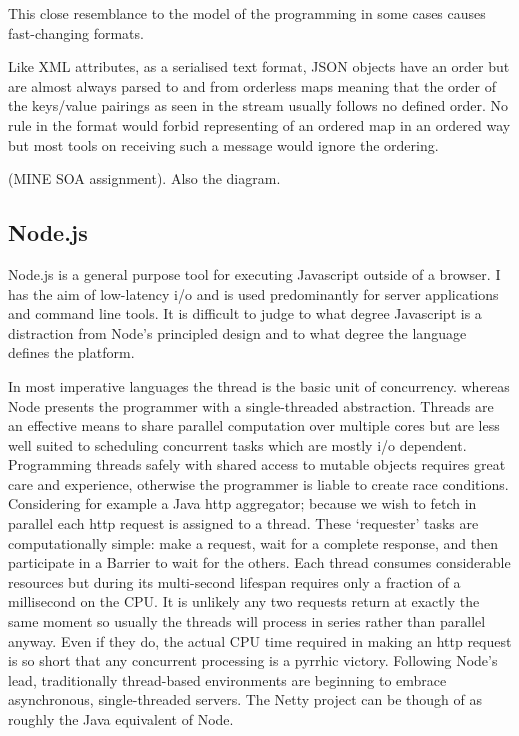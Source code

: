 \documentclass[]{article}
\begin{document}
This close resemblance to the model of the programming in some cases
causes fast-changing formats.

Like XML attributes, as a serialised text format, JSON objects have an
order but are almost always parsed to and from orderless maps meaning
that the order of the keys/value pairings as seen in the stream usually
follows no defined order. No rule in the format would forbid
representing of an ordered map in an ordered way but most tools on
receiving such a message would ignore the ordering.

(MINE SOA assignment). Also the diagram.

\subsection{Node.js}

Node.js is a general purpose tool for executing Javascript outside of a
browser. I has the aim of low-latency i/o and is used predominantly for
server applications and command line tools. It is difficult to judge to
what degree Javascript is a distraction from Node's principled design
and to what degree the language defines the platform.

In most imperative languages the thread is the basic unit of
concurrency. whereas Node presents the programmer with a single-threaded
abstraction. Threads are an effective means to share parallel
computation over multiple cores but are less well suited to scheduling
concurrent tasks which are mostly i/o dependent. Programming threads
safely with shared access to mutable objects requires great care and
experience, otherwise the programmer is liable to create race
conditions. Considering for example a Java http aggregator; because we
wish to fetch in parallel each http request is assigned to a thread.
These `requester' tasks are computationally simple: make a request, wait
for a complete response, and then participate in a Barrier to wait for
the others. Each thread consumes considerable resources but during its
multi-second lifespan requires only a fraction of a millisecond on the
CPU. It is unlikely any two requests return at exactly the same moment
so usually the threads will process in series rather than parallel
anyway. Even if they do, the actual CPU time required in making an http
request is so short that any concurrent processing is a pyrrhic victory.
Following Node's lead, traditionally thread-based environments are
beginning to embrace asynchronous, single-threaded servers. The Netty
project can be though of as roughly the Java equivalent of Node.
\end{document}
